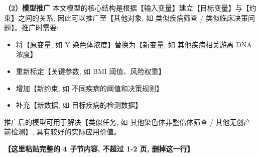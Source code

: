 \textbf{（2）模型推广} \quad 本文模型的核心结构是根据【输入变量】建立【目标变量】与【约束】之间的关系, 因此可以推广至【其他对象, 如 类似疾病筛查 / 类似临床决策问题】。推广时需要:
\begin{itemize}
  \item 将【原变量, 如 Y 染色体浓度】替换为【新变量, 如 其他疾病相关游离 DNA 浓度】
  \item 重新标定【关键参数, 如 BMI 阈值、风险权重】
  \item 增加【新约束, 如 不同疾病的阈值和决策规则】
  \item 补充【新数据, 如 目标疾病的检测数据】
\end{itemize}

推广后的模型可用于解决【类似任务, 如 其他染色体非整倍体筛查 / 其他无创产前检测】, 具有较好的实际应用价值。

\textbf{【这里粘贴完整的 4 子节内容, 不超过 1-2 页, 删掉这一行】}
